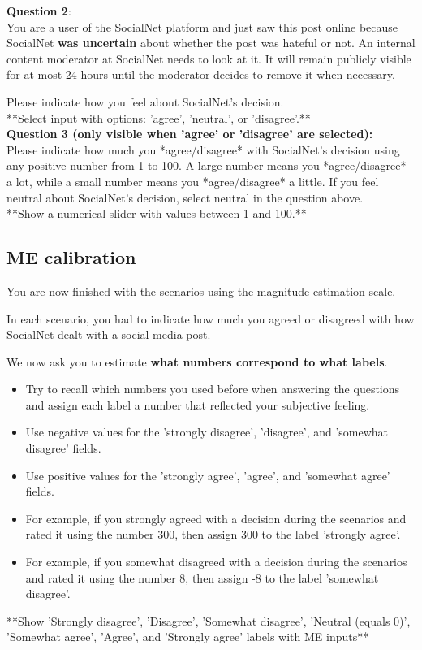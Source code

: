 \documentclass[a4paper]{article}
\begin{document}
\textbf{Question 2}:\\
You are a user of the SocialNet platform and just saw this post online because SocialNet \textbf{was uncertain} about whether the post was hateful or not. An internal content moderator at SocialNet needs to look at it. It will remain publicly visible for at most 24 hours until the moderator decides to remove it when necessary.

Please indicate how you feel about SocialNet's decision.\\

**Select input with options: 'agree', 'neutral', or 'disagree'.**\\

\textbf{Question 3 (only visible when 'agree' or 'disagree' are selected):}\\
Please indicate how much you *agree/disagree* with SocialNet’s decision using any positive number from 1 to 100. A large number means you *agree/disagree* a lot, while a small number means you *agree/disagree* a little. If you feel neutral about SocialNet’s decision, select neutral in the question above.\\

**Show a numerical slider with values between 1 and 100.**\\


\subsection{ME calibration}
You are now finished with the scenarios using the magnitude estimation scale.

In each scenario, you had to indicate how much you agreed or disagreed with how SocialNet dealt with a social media post.

We now ask you to estimate \textbf{what numbers correspond to what labels}.

\begin{itemize}
    \item Try to recall which numbers you used before when answering the questions and assign each label a number that reflected your subjective feeling.
    \item Use negative values for the 'strongly disagree', 'disagree', and 'somewhat disagree' fields.
    \item Use positive values for the 'strongly agree', 'agree', and 'somewhat agree' fields.
    \item For example, if you strongly agreed with a decision during the scenarios and rated it using the number 300, then assign 300 to the label 'strongly agree'.
    \item For example, if you somewhat disagreed with a decision during the scenarios and rated it using the number 8, then assign -8 to the label 'somewhat disagree'.
\end{itemize}

**Show 'Strongly disagree', 'Disagree', 'Somewhat disagree', 'Neutral (equals 0)', 'Somewhat agree', 'Agree', and 'Strongly agree' labels with ME inputs**



\end{document}
